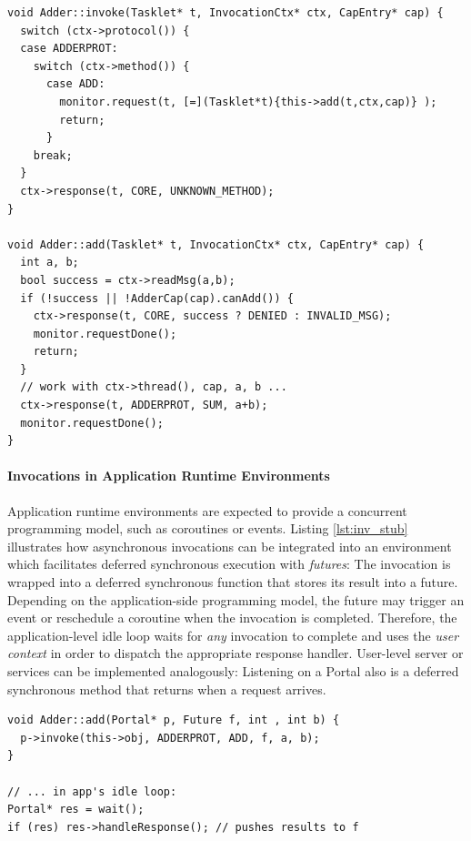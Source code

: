 \begin{lstlisting}[float, label=lst:inv_skel, caption=Kernel-side dispatch and implementation of a method invocation.]
void Adder::invoke(Tasklet* t, InvocationCtx* ctx, CapEntry* cap) {
  switch (ctx->protocol()) {
  case ADDERPROT:
    switch (ctx->method()) {
      case ADD: 
        monitor.request(t, [=](Tasklet*t){this->add(t,ctx,cap)} );
        return;
      }
    break;
  }
  ctx->response(t, CORE, UNKNOWN_METHOD);
}

void Adder::add(Tasklet* t, InvocationCtx* ctx, CapEntry* cap) {
  int a, b;
  bool success = ctx->readMsg(a,b);
  if (!success || !AdderCap(cap).canAdd()) {
  	ctx->response(t, CORE, success ? DENIED : INVALID_MSG); 
  	monitor.requestDone();
  	return;
  }
  // work with ctx->thread(), cap, a, b ...
  ctx->response(t, ADDERPROT, SUM, a+b);
  monitor.requestDone();
}
\end{lstlisting}

\paragraph{Invocations in Application Runtime Environments}

Application runtime environments are expected to provide a concurrent programming model, such as coroutines or events. Listing \ref{lst:inv_stub} illustrates how asynchronous invocations can be integrated into an environment which facilitates deferred synchronous execution with \emph{futures}: The invocation is wrapped into a deferred synchronous function that stores its result into a future. Depending on the application-side programming model, the future may trigger an event or reschedule a coroutine when the invocation is completed. Therefore, the application-level idle loop waits for \emph{any} invocation to complete and uses the \emph{user context}  in order to dispatch the appropriate response handler. User-level server or services can be implemented analogously: Listening on a Portal also is a deferred synchronous method that returns when a request arrives.

\begin{lstlisting}[float, label=lst:inv_stub, caption=Example for issuing invocation user-side.]
void Adder::add(Portal* p, Future f, int , int b) {
  p->invoke(this->obj, ADDERPROT, ADD, f, a, b); 
}

// ... in app's idle loop:
Portal* res = wait();
if (res) res->handleResponse(); // pushes results to f
\end{lstlisting}


